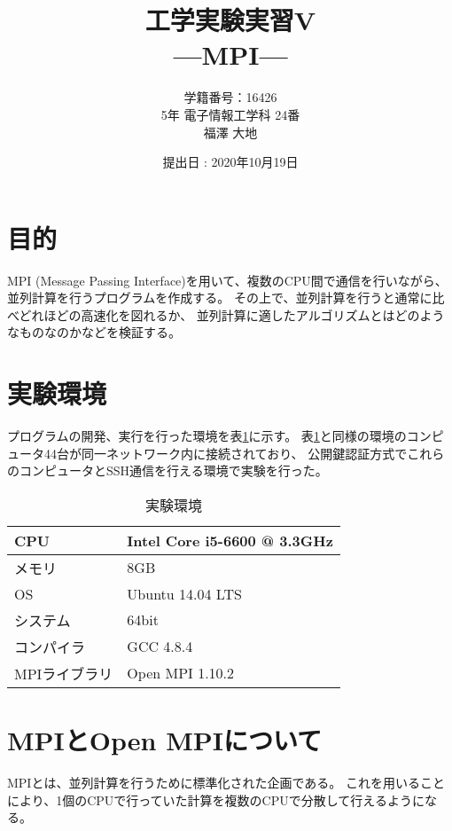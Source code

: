 \documentclass[a4j,titlepage]{jsarticle}
\begin{document}
\begin{titlepage}
  \title{\huge{工学実験実習V} \\ \LARGE{---MPI---}}
	\author{学籍番号：16426 \\ 5年 電子情報工学科 24番 \\ 福澤 大地}
	\date{提出日 : 2020年10月19日}
  \maketitle
\end{titlepage}


\section{目的}
MPI (Message Passing Interface)を用いて、複数のCPU間で通信を行いながら、
並列計算を行うプログラムを作成する。
その上で、並列計算を行うと通常に比べどれほどの高速化を図れるか、
並列計算に適したアルゴリズムとはどのようなものなのかなどを検証する。


\section{実験環境}
プログラムの開発、実行を行った環境を表\ref{tb:kan}に示す。
表\ref{tb:kan}と同様の環境のコンピュータ44台が同一ネットワーク内に接続されており、
公開鍵認証方式でこれらのコンピュータとSSH通信を行える環境で実験を行った。

\begin{table}[H]
  \centering
  \caption{実験環境}
  \label{tb:kan}

  \begin{tabular}{|l|l|}
    \hline
    CPU & Intel Core i5-6600 @ 3.3GHz \\ \hline
    メモリ & 8GB \\ \hline
    OS & Ubuntu 14.04 LTS \\ \hline
    システム & 64bit \\ \hline
    コンパイラ & GCC 4.8.4 \\ \hline
    MPIライブラリ & Open MPI 1.10.2 \\ \hline
  \end{tabular}
\end{table}


\section{MPIとOpen MPIについて}
MPIとは、並列計算を行うために標準化された企画である。
これを用いることにより、1個のCPUで行っていた計算を複数のCPUで分散して行えるようになる。
\end{document}
